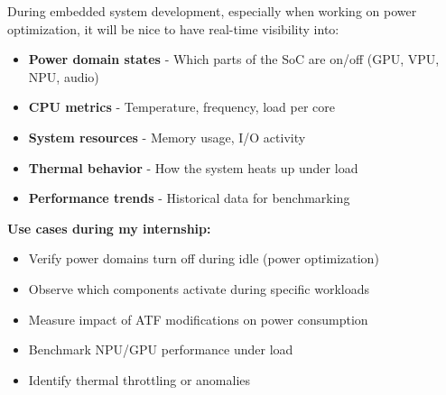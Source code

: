 \documentclass[12pt,a4paper]{report}
\begin{document}
During embedded system development, especially when working on power optimization, it will be nice to have  real-time visibility into:

\begin{itemize}
    \item \textbf{Power domain states} - Which parts of the SoC are on/off (GPU, VPU, NPU, audio)
    \item \textbf{CPU metrics} - Temperature, frequency, load per core
    \item \textbf{System resources} - Memory usage, I/O activity
    \item \textbf{Thermal behavior} - How the system heats up under load
    \item \textbf{Performance trends} - Historical data for benchmarking
\end{itemize}

\textbf{Use cases during my internship:}
\begin{itemize}
    \item Verify power domains turn off during idle (power optimization)
    \item Observe which components activate during specific workloads
    \item Measure impact of ATF modifications on power consumption
    \item Benchmark NPU/GPU performance under load
    \item Identify thermal throttling or anomalies
\end{itemize}
\end{document}
